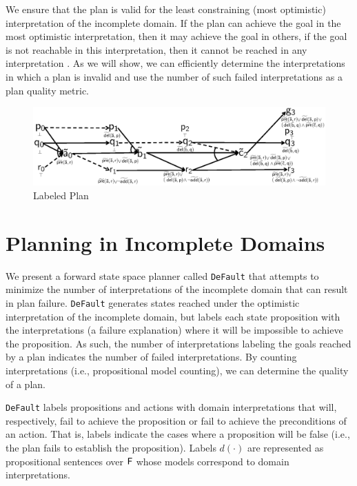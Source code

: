 \documentclass[letterpaper]{article}
\def\default{{\tt DeFault}}
\def\citep#1{\cite{#1}}
\begin{document}
We ensure that the plan is valid for the least constraining (most optimistic)
interpretation of the incomplete domain. If the plan can achieve the goal in the
most optimistic interpretation, then it may achieve the goal in others,  if
the goal is not reachable in this interpretation, then it cannot be reached in
any interpretation \citep{USU-CS-TR-11-001}.  As we will show, we can
efficiently determine the interpretations in which a plan is invalid and use the
number of such failed interpretations as a plan quality metric.


\begin{figure}[t]\centering
\vspace*{-1cm}
\includegraphics[width=.95\linewidth]{WeberBryceICAPS11Fig1.eps}
\vspace*{-1cm}\caption{\label{fig:example} Labeled Plan}
\end{figure}



\section{Planning in Incomplete Domains}

We present a forward state space planner called \default{} that attempts to
minimize the number of interpretations of the incomplete domain that can result
in plan failure.  \default{} generates states reached under the optimistic
interpretation of the incomplete domain, but labels each state proposition with
the interpretations (a failure explanation) where it will be impossible to
achieve the proposition. As such, the number of interpretations labeling the
goals reached by a plan indicates the number of failed interpretations.  By
counting interpretations (i.e., propositional model counting), we can determine
the quality of a plan.

\default{} labels propositions and actions with domain interpretations that
will, respectively, fail to achieve the proposition or fail to achieve the
preconditions of an action.  That is, labels indicate the cases where a
proposition will be false (i.e., the plan fails to establish the proposition). 
Labels $d(\cdot)$ are represented as  propositional sentences over ${\sf F}$
whose models correspond to domain interpretations.
\end{document}
